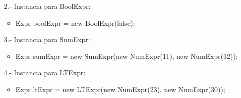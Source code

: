 \documentclass{article}
\begin{document}
\begin{itemize}
\begin{itemize}
\begin{enumerate}
                \item[2.-] Instancia para BoolExpr:\\
                \begin{itemize}
                    \item Expr boolExpr = new BoolExpr(false);\\
                \end{itemize}

                \item[3.-] Instancia para SumExpr:\\
                \begin{itemize}
                    \item Expr sumExpr = new SumExpr(new NumExpr(11), new NumExpr(32));\\
                \end{itemize}

                \item[4.-] Instancia para LTExpr:\\
                \begin{itemize}
                    \item Expr ltExpr = new LTExpr(new NumExpr(23), new NumExpr(30));\\
                \end{itemize}
            \end{enumerate}
            
        \end{itemize}
    \end{itemize}
\end{document}
